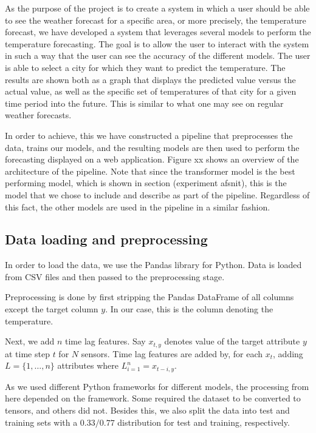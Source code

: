 As the purpose of the project is to create a system in which a user should be able to see the weather forecast for a specific area, or more precisely, the temperature forecast, we have developed a system that leverages several models to perform the temperature forecasting. 
The goal is to allow the user to interact with the system in such a way that the user can see the accuracy of the different models. 
The user is able to select a city for which they want to predict the temperature. The results are shown both as a graph that displays the predicted value versus the actual value, as well as the specific set of temperatures of that city for a given time period into the future. This is similar to what one may see on regular weather forecasts.

In order to achieve, this we have constructed a pipeline that preprocesses the data, trains our models, and the resulting models are then used to perform the forecasting displayed on a web application. 
Figure xx shows an overview of the architecture of the pipeline.
Note that since the transformer model is the best performing model, which is shown in section (experiment afsnit), this is the model that we chose to include and describe as part of the pipeline. Regardless of this fact, the other models are used in the pipeline in a similar fashion.

\subsection{Data loading and preprocessing}
In order to load the data, we use the Pandas library for Python.
Data is loaded from CSV files and then passed to the preprocessing stage.

Preprocessing is done by first stripping the Pandas DataFrame of all columns except the target column $y$. In our case, this is the column denoting the temperature.

Next, we add $n$ time lag features. Say $x_{t,y}$ denotes value of the target attribute $y$ at time step $t$ for $N$ sensors. Time lag features are added by, for each $x_{t}$, adding $L=\{1,\dots, n\}$ attributes where $L_{i=1}^n=x_{t-i, y}$.

As we used different Python frameworks for different models, the processing from here depended on the framework. Some required the dataset to be converted to tensors, and others did not.
Besides this, we also split the data into test and training sets with a $0.33/0.77$ distribution for test and training, respectively.

